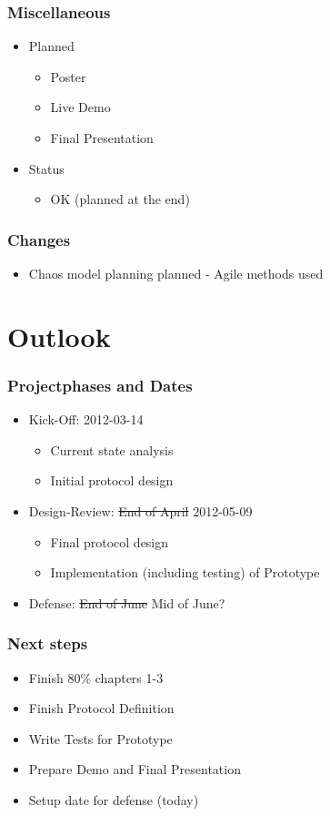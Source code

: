 \documentclass{beamer}
\begin{document}
\frame
{
  \frametitle{Miscellaneous}
  \begin{itemize}
      \item Planned
      \begin{itemize}
          \item Poster
          \item Live Demo
          \item Final Presentation
      \end{itemize}
      \item Status
      \begin{itemize}
          \item OK (planned at the end)
      \end{itemize}
  \end{itemize}
}

\frame
{
  \frametitle{Changes}
  \begin{itemize}
    \item Chaos model planning planned - \alert{Agile methods used}
  \end{itemize}
}

\section{Outlook}
\frame
{
  \frametitle{Projectphases and Dates}
  \begin{itemize}
     \item Kick-Off: 2012-03-14
      \begin{itemize}
         \item Current state analysis
         \item Initial protocol design
      \end{itemize}
     \item Design-Review: \sout{End of April} \alert{2012-05-09}
     \begin{itemize}
         \item Final protocol design
         \item Implementation (including testing) of Prototype
     \end{itemize}
     \item Defense: \sout{End of June} \alert{Mid of June?}
  \end{itemize}
}

\frame
{
  \frametitle{Next steps}
  \begin{itemize}
    \item Finish 80\% chapters 1-3
    \item Finish Protocol Definition
    \item Write Tests for Prototype
    \item Prepare Demo and Final Presentation
    \item Setup date for defense (today)
  \end{itemize}
}
\end{document}
